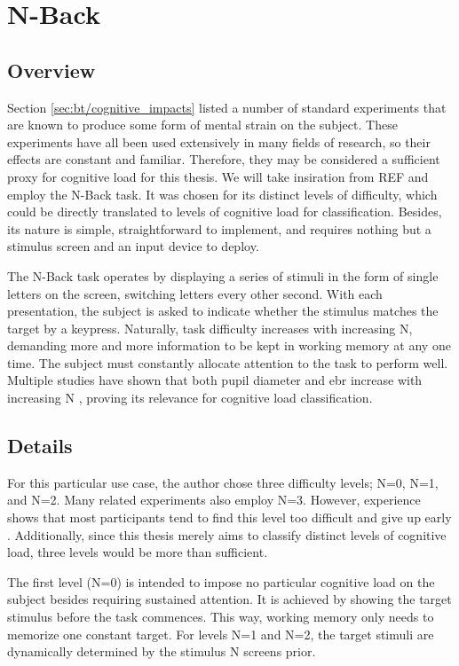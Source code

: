\section{N-Back} \label{sec:impl/tasks}
\subsection{Overview}

Section \ref{sec:bt/cognitive_impacts} listed a number of standard experiments that are known to produce some form of mental strain on the subject. These experiments have all been used extensively in many fields of research, so their effects are constant and familiar. Therefore, they may be considered a sufficient proxy for cognitive load for this thesis. We will take insiration from REF and employ the N-Back task. It was chosen for its distinct levels of difficulty, which could be directly translated to levels of cognitive load for classification. Besides, its nature is simple, straightforward to implement, and requires nothing but a stimulus screen and an input device to deploy. 

The N-Back task operates by displaying a series of stimuli in the form of single letters on the screen, switching letters every other second. With each presentation, the subject is asked to indicate whether the stimulus matches the target by a keypress. Naturally, task difficulty increases with increasing N, demanding more and more information to be kept in working memory at any one time. The subject must constantly allocate attention to the task to perform well. Multiple studies have shown that both pupil diameter and \acrshort{ebr} increase with increasing N \cite{hopstaken2015, belayachi2015, brouwer2014, niezgoda2015}, proving its relevance for cognitive load classification. 

\subsection{Details}

For this particular use case, the author chose three difficulty levels; N=0, N=1, and N=2. Many related experiments also employ N=3. However, experience shows that most participants tend to find this level too difficult and give up early \cite{ayaz2007, izzetoglu2007}. Additionally, since this thesis merely aims to classify distinct levels of cognitive load, three levels would be more than sufficient.

The first level (N=0) is intended to impose no particular cognitive load on the subject besides requiring sustained attention. It is achieved by showing the target stimulus before the task commences. This way, working memory only needs to memorize one constant target. For levels N=1 and N=2, the target stimuli are dynamically determined by the stimulus N screens prior.

